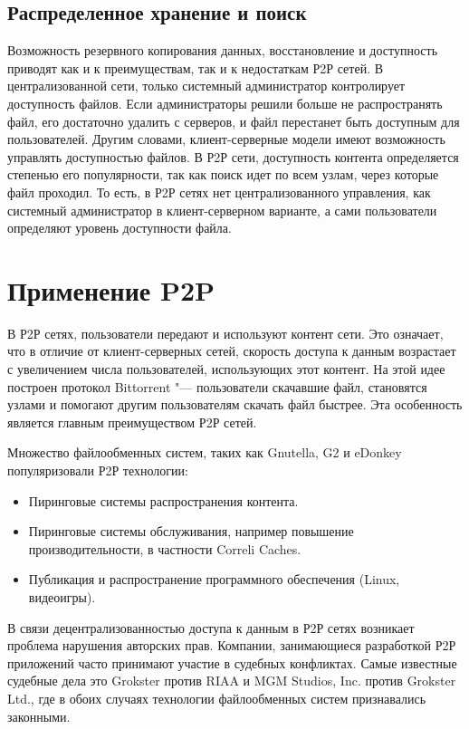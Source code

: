 \documentclass[bachelor, och, coursework]{SCWorks}
\begin{document}
\subsection{Распределенное хранение и поиск}
Возможность резервного копирования данных, восстановление и доступность приводят как и к преимуществам, так и к недостаткам Р2Р сетей. 
В централизованной сети, только системный администратор контролирует доступность файлов. 
Если администраторы решили больше не распространять файл, его достаточно удалить с серверов,
и файл перестанет быть доступным для пользователей. Другим словами, клиент-серверные модели имеют возможность управлять доступностью файлов. 
В Р2Р сети, доступность контента определяется степенью его популярности, так как поиск идет по всем узлам, через которые файл проходил. 
То есть, в Р2Р сетях нет централизованного управления, как системный администратор в клиент-серверном варианте, 
а сами пользователи определяют уровень доступности файла.

\section{Применение P2P}
В Р2Р сетях, пользователи передают и используют контент сети. Это означает, что в отличие от клиент-серверных сетей, 
скорость доступа к данным возрастает с увеличением числа пользователей, использующих этот контент. 
На этой идее построен протокол Bittorrent "--- пользователи скачавшие файл, становятся узлами и помогают другим пользователям скачать файл быстрее. 
Эта особенность является главным преимуществом Р2Р сетей.

Множество файлообменных систем, таких как Gnutella, G2 и eDonkey популяризовали Р2Р технологии:
\begin{itemize}
    \item Пиринговые системы распространения контента.
    \item Пиринговые системы обслуживания, например повышение производительности, в частности Correli Caches.
    \item Публикация и распространение программного обеспечения (Linux, видеоигры).
\end{itemize}

В связи децентрализованностью доступа к данным в Р2Р сетях возникает проблема нарушения авторских прав. 
Компании, занимающиеся разработкой Р2Р приложений часто принимают участие в судебных конфликтах. 
Самые известные судебные дела это Grokster против RIAA и MGM Studios, Inc. против Grokster Ltd., 
где в обоих случаях технологии файлообменных систем признавались законными.
\end{document}
